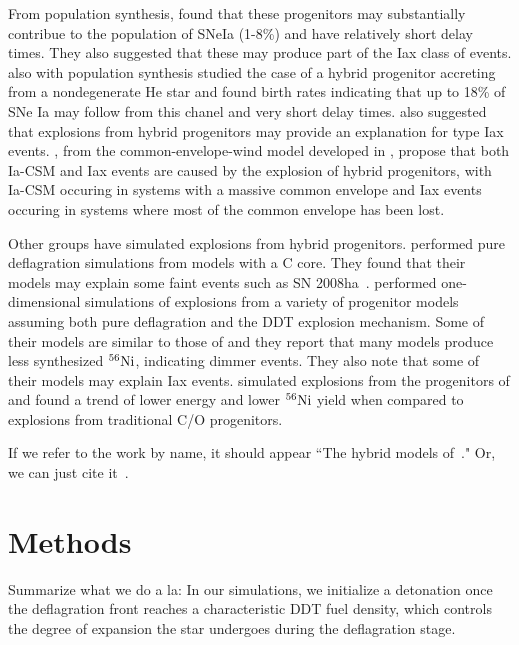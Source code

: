 \documentclass[iop,apj]{emulateapj}
\newcommand{\Ni}[1]{\ensuremath{{}^{#1}{\rm Ni}}}
\begin{document}
From population synthesis, \citet{mengpods2014} found that these
progenitors may substantially contribue to the population of SNeIa (1-8\%) and have
relatively short delay times. They also suggested that these 
may produce part of the Iax class of events. \citet{Wangetal2014} also with population
synthesis studied the case
of a hybrid progenitor accreting from a nondegenerate He star and found
birth rates indicating that up to 18\% of SNe Ia may follow from this chanel
and very short delay times. \citet{Wangetal2014} also suggested that explosions 
from hybrid progenitors may provide an explanation for type Iax events.
\citet{mengpods2018}, from the common-envelope-wind model developed in 
\citep{mengpods2014}, propose that both Ia-CSM and Iax events 
are caused by the explosion of hybrid progenitors, with Ia-CSM occuring in systems with 
a massive common envelope and Iax events occuring in systems where most of the common envelope
has been lost.

Other groups have simulated explosions from hybrid progenitors. 
\citet{kromeretal2015} performed pure deflagration simulations from models 
with a C core. They found that their models may explain some faint events 
such as SN 2008ha~\citep{foleyetal2009}.
\citet{bravoetal2016} performed one-dimensional simulations of explosions from 
a variety of progenitor models assuming both pure deflagration and the DDT 
explosion mechanism. 
Some of their models are similar to those of \citep{denissenkovetal2015} and 
they report that many models produce less synthesized
\Ni{56}, indicating dimmer events. They also note that some of their
models may explain Iax events.
\citet{willcoxetal2016} simulated explosions from the progenitors of 
\citep{denissenkovetal2015} and found a trend of lower energy and lower
\Ni{56} yield when compared to explosions from traditional C/O progenitors.


If we refer to the work by name, it should appear ``The hybrid models
of~\citet{brooksetal2017}." Or, we can just cite it~\citep{brooksetal2017}.




\section{Methods}

Summarize what we do a la:
In our simulations, we initialize a detonation once the 
deflagration front reaches a
characteristic DDT fuel density, which controls the degree of
expansion the star undergoes during the deflagration stage.
\end{document}
